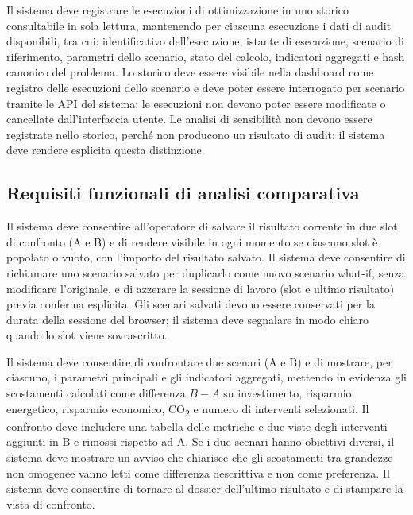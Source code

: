  \label{rf:storico}
Il sistema deve registrare le esecuzioni di ottimizzazione in uno storico consultabile in sola lettura, mantenendo per ciascuna esecuzione i dati di audit disponibili, tra cui: identificativo dell'esecuzione, istante di esecuzione, scenario di riferimento, parametri dello scenario, stato del calcolo, indicatori aggregati e hash canonico del problema. Lo storico deve essere visibile nella dashboard come registro delle esecuzioni dello scenario e deve poter essere interrogato per scenario tramite le API del sistema; le esecuzioni non devono poter essere modificate o cancellate dall'interfaccia utente. Le analisi di sensibilità non devono essere registrate nello storico, perché non producono un risultato di audit: il sistema deve rendere esplicita questa distinzione.

\subsection{Requisiti funzionali di analisi comparativa}

 \label{rf:scenari_salvati}
Il sistema deve consentire all'operatore di salvare il risultato corrente in due slot di confronto (A e B) e di rendere visibile in ogni momento se ciascuno slot è popolato o vuoto, con l'importo del risultato salvato. Il sistema deve consentire di richiamare uno scenario salvato per duplicarlo come nuovo scenario what-if, senza modificare l'originale, e di azzerare la sessione di lavoro (slot e ultimo risultato) previa conferma esplicita. Gli scenari salvati devono essere conservati per la durata della sessione del browser; il sistema deve segnalare in modo chiaro quando lo slot viene sovrascritto.

 \label{rf:confronto}
Il sistema deve consentire di confrontare due scenari (A e B) e di mostrare, per ciascuno, i parametri principali e gli indicatori aggregati, mettendo in evidenza gli scostamenti calcolati come differenza $B - A$ su investimento, risparmio energetico, risparmio economico, CO\textsubscript{2} e numero di interventi selezionati. Il confronto deve includere una tabella delle metriche e due viste degli interventi aggiunti in B e rimossi rispetto ad A. Se i due scenari hanno obiettivi diversi, il sistema deve mostrare un avviso che chiarisce che gli scostamenti tra grandezze non omogenee vanno letti come differenza descrittiva e non come preferenza. Il sistema deve consentire di tornare al dossier dell'ultimo risultato e di stampare la vista di confronto.

